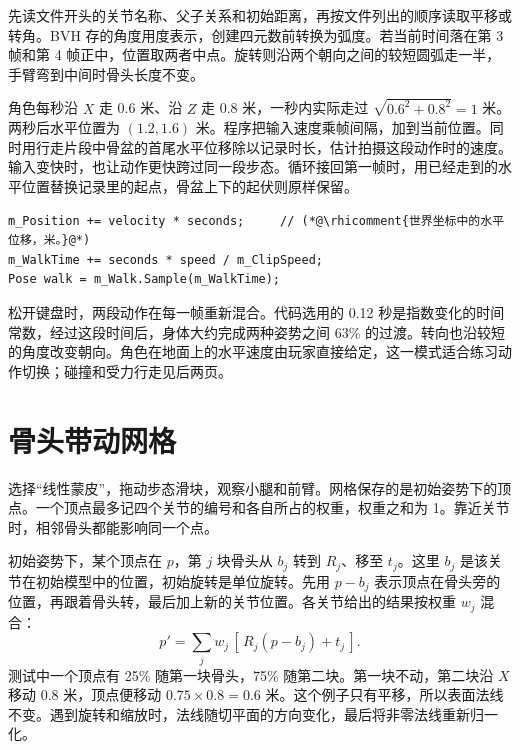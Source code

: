 
 先读文件开头的关节名称、父子关系和初始距离，再按文件列出的顺序读取平移或转角。BVH 存的角度用度表示，创建四元数前转换为弧度。若当前时间落在第 3 帧和第 4 帧正中，位置取两者中点。旋转则沿两个朝向之间的较短圆弧走一半，手臂弯到中间时骨头长度不变。

角色每秒沿 $X$ 走 0.6 米、沿 $Z$ 走 0.8 米，一秒内实际走过 $\sqrt{0.6^2+0.8^2}=1$ 米。两秒后水平位置为 $(1.2,1.6)$ 米。程序把输入速度乘帧间隔，加到当前位置。同时用行走片段中骨盆的首尾水平位移除以记录时长，估计拍摄这段动作时的速度。输入变快时，也让动作更快跨过同一段步态。循环接回第一帧时，用已经走到的水平位置替换记录里的起点，骨盆上下的起伏则原样保留。

\begin{lstlisting}[style=besidetext]
m_Position += velocity * seconds;     // (*@\rhicomment{世界坐标中的水平位移，米。}@*)
m_WalkTime += seconds * speed / m_ClipSpeed;
Pose walk = m_Walk.Sample(m_WalkTime);
\end{lstlisting}

松开键盘时，两段动作在每一帧重新混合。代码选用的 0.12 秒是指数变化的时间常数，经过这段时间后，身体大约完成两种姿势之间 63\% 的过渡。转向也沿较短的角度改变朝向。角色在地面上的水平速度由玩家直接给定，这一模式适合练习动作切换；碰撞和受力行走见后两页。

\clearpage
\section{骨头带动网格}
选择“线性蒙皮”，拖动步态滑块，观察小腿和前臂。网格保存的是初始姿势下的顶点。一个顶点最多记四个关节的编号和各自所占的权重，权重之和为 1。靠近关节时，相邻骨头都能影响同一个点。


初始姿势下，某个顶点在 $p$，第 $j$ 块骨头从 $b_j$ 转到 $R_j$、移至 $t_j$。这里 $b_j$ 是该关节在初始模型中的位置，初始旋转是单位旋转。先用 $p-b_j$ 表示顶点在骨头旁的位置，再跟着骨头转，最后加上新的关节位置。各关节给出的结果按权重 $w_j$ 混合：
\[
             p'=\sum_j w_j\,[\,R_j(p-b_j)+t_j\,].
\]
测试中一个顶点有 25\% 随第一块骨头，75\% 随第二块。第一块不动，第二块沿 $X$ 移动 0.8 米，顶点便移动 $0.75\times0.8=0.6$ 米。这个例子只有平移，所以表面法线不变。遇到旋转和缩放时，法线随切平面的方向变化，最后将非零法线重新归一化。

